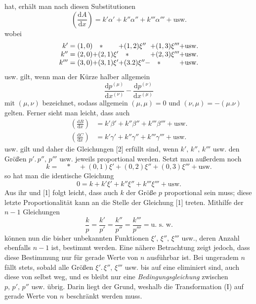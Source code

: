 hat, erhält man nach diesen Substitutionen
\[
\left(\frac{\mathrm{d}A}{\mathrm{d}x}\right)=k'\alpha'+k''\alpha''+k'''\alpha'''+\text{usw.}
\]
wobei
\[
\begin{array}{r@{}l@{}l@{}l@{}l@{}l}
k'={}&(1,0)&\quad *\quad&+(1,2)\xi''&+(1,3)\xi'''&+\text{usw.}\\
k''={}&(2,0)&+(2,1)\xi'&\quad *\quad&+(2,3)\xi'''&+\text{usw.}\\
k'''={}&(3,0)&+(3,1)\xi'&+(3.2)\xi''-&\quad *\quad&+\text{usw.}
\end{array}
\]
usw. gilt, wenn man der Kürze halber allgemein
\[
\frac{\mathrm{d}p^{(\mu)}}{\mathrm{d}x^{(\nu)}}
-\frac{\mathrm{d}p^{(\nu)}}{\mathrm{d}x^{(\mu)}}
\]
mit $(\mu,\nu)$ bezeichnet, sodass allgemein $(\mu,\mu)=0$ und $(\nu,\mu)=-(\mu.\nu)$ gelten.
Ferner sieht man leicht, dass auch
\[
\begin{aligned}
\left(\frac{\mathrm{d}B}{\mathrm{d}x}\right)&=k'\beta'+k''\beta''+k'''\beta'''+\text{usw.}\\
\left(\frac{\mathrm{d}C}{\mathrm{d}x}\right)&=k'\gamma'+k''\gamma''+k'''\gamma'''+\text{usw.}
\end{aligned}
\]
usw. gilt und daher die Gleichungen [2] erfüllt sind, wenn \(k',\,k'',\,k'''\) usw. den Größen \(p'.\,p'',\,p'''\) usw. jeweils proportional werden. Setzt man außerdem noch
\[
k=\quad *\quad +(0,1)\xi'+(0,2)\xi''+(0,3)\xi'''+\text{usw.}
\]
so hat man die identische Gleichung
\[
0=k+k'\xi'+k''\xi''+k'''\xi'''+\text{usw.}
\]
Aus ihr und [1] folgt leicht, dass auch \(k\) der Größe \(p\) proportional sein muss; diese letzte Proportionalität kann an die Stelle der Gleichung [1] treten. Mithilfe der \(n-1\) Gleichungen
\[
\frac{k}{p}=\frac{k'}{p'}=\frac{k''}{p''}=\frac{k'''}{p'''}=\text{u.\ s.\ w.}
\]
können nun die bisher unbekannten Funktionen \(\xi',\,\xi'',\,\xi'''\) usw., deren Anzahl ebenfalls \(n-1\) ist, bestimmt werden. Eine nähere Betrachtung zeigt jedoch, dass diese Bestimmung nur für gerade Werte von \(n\) ausführbar ist. Bei ungeradem \(n\) fällt stets, sobald alle Größen \(\xi'.\,\xi'',\,\xi'''\) usw. bis auf eine eliminiert sind, auch diese von selbst weg, und es bleibt nur eine \emph{Bedingungsgleichung} zwischen \(p,\,p',\,p''\) usw. übrig. Darin liegt der Grund, weshalb die Transformation (I) auf gerade Werte von \(n\) beschränkt werden muss.

